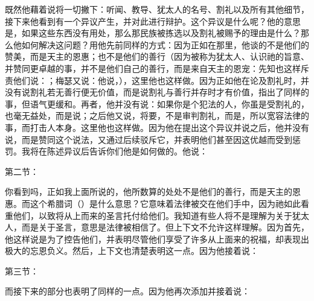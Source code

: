 既然他藉着说将一切撇下：听闻、教导、犹太人的名号、割礼以及所有其他细节，接下来他看到有一个异议产生，并对此进行辩护。这个异议是什么呢？他的意思是，如果这些东西没有用处，那么那民族被拣选以及割礼被赐予的理由是什么？那么他如何解决这问题？用他先前同样的方式：因为正如在那里，他谈的不是他们的赞美，而是天主的恩惠；也不是他们的善行（因为被称为犹太人、认识祂的旨意、并赞同更卓越的事，并不是他们自己的善行，而是来自天主的恩宠：先知也这样斥责他们说：；梅瑟又说：他说，），这里他也这样做。因为正如他在论及割礼时，并没有说割礼若无善行便无价值，而是说割礼与善行并存时才有价值，指出了同样的事，但语气更缓和。再者，他并没有说：如果你是个犯法的人，你虽是受割礼的，也毫无益处，而是说；之后他又说，将要，不是审判割礼，而是，所以宽容法律的事，而打击人本身。这里他也这样做。因为他在提出这个异议并说之后，他并没有说，而是赞同这个说法，又通过后续驳斥它，并表明他们甚至因这优越而受到惩罚。我将在陈述异议后告诉你们他是如何做的。他说：\par

第二节：\par

你看到吗，正如我上面所说的，他所数算的处处不是他们的善行，而是天主的恩惠。而这个希腊词（）是什么意思？它意味着法律被交在他们手中，因为祂如此看重他们，以致将从上而来的圣言托付给他们。我知道有些人将不是理解为关于犹太人，而是关于圣言，意思是法律被相信了。但上下文不允许这样理解。因为首先，他这样说是为了控告他们，并表明尽管他们享受了许多从上面来的祝福，却表现出极大的忘恩负义。然后，上下文也清楚表明这一点。因为他接着说：\par

第三节：\par

而接下来的部分也表明了同样的一点。因为他再次添加并接着说：\par

